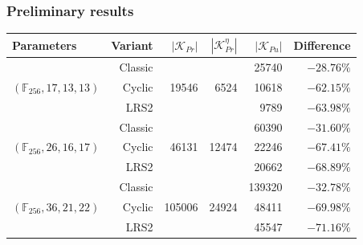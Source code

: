 \documentclass[12pt]{beamer}
\begin{document}
\begin{frame}
  \frametitle{Preliminary results~\cite{Zambonin:inproc:2019:jul}}
  \begin{table}[htbp]
    \footnotesize
    \renewcommand{\arraystretch}{1.2}
    \setlength{\tabcolsep}{7pt}
    \centering
    \begin{tabular}{*{1}{l}*{5}{r}}
      \toprule
      Parameters & Variant
        & $|\mathcal{K}_{Pr}|$ & $|\mathcal{K}_{Pr}^{\eta}|$
        & $|\mathcal{K}_{Pu}|$ & Difference \\ \midrule
      \multirow{3}{*}{$(\mathbb{F}_{256}, 17, 13, 13)$}
        &  Classic &  \multirow{3}{*}{ 19546} &  \multirow{3}{*}{ 6524}
                                                &   25740 & $-28.76\%$ \\
        &   Cyclic &                          & &   10618 & $-62.15\%$ \\
        &     LRS2 &                          & &    9789 & $-63.98\%$ \\
      \multirow{3}{*}{$(\mathbb{F}_{256}, 26, 16, 17)$}
        &  Classic &  \multirow{3}{*}{ 46131} &  \multirow{3}{*}{12474}
                                                &   60390 & $-31.60\%$ \\
        &   Cyclic &                          & &   22246 & $-67.41\%$ \\
        &     LRS2 &                          & &   20662 & $-68.89\%$ \\
      \multirow{3}{*}{$(\mathbb{F}_{256}, 36, 21, 22)$}
        &  Classic &  \multirow{3}{*}{105006} &  \multirow{3}{*}{24924}
                                                &  139320 & $-32.78\%$ \\
        &   Cyclic &                          & &   48411 & $-69.98\%$ \\
        &     LRS2 &                          & &   45547 & $-71.16\%$ \\
      \bottomrule
    \end{tabular}
  \end{table}
\end{frame}
\end{document}
